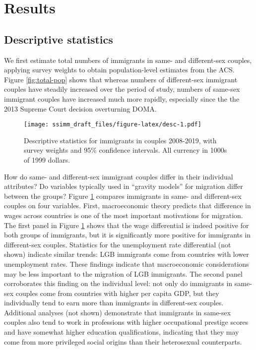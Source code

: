 \documentclass[
  11pt,
]{article}
\begin{document}
\hypertarget{results}{%
\section{Results}\label{results}}

\hypertarget{descriptive-statistics}{%
\subsection{Descriptive statistics}\label{descriptive-statistics}}

We first estimate total numbers of immigrants in same- and different-sex couples, applying survey weights to obtain population-level estimates from the ACS. Figure \ref{fig:total-pop} shows that whereas numbers of different-sex immigrant couples have steadily increased over the period of study, numbers of same-sex immigrant couples have increased much more rapidly, especially since the the 2013 Supreme Court decision overturning DOMA.

\begin{figure}
\centering
\texttt{[image: ssimm\_draft\_files/figure-latex/desc-1.pdf]}
\caption{\label{fig:desc}Descriptive statistics for immigrants in couples 2008-2019, with survey weights and 95\% confidence intervals. All currency in 1000s of 1999 dollars.}
\end{figure}

How do same- and different-sex immigrant couples differ in their individual attributes? Do variables typically used in ``gravity models'' for migration differ between the groups? Figure \ref{fig:desc} compares immigrants in same- and different-sex couples on four variables. First, macroeconomic theory predicts that difference in wages across countries is one of the most important motivations for migration. The first panel in Figure \ref{fig:desc} shows that the wage differential is indeed positive for both groups of immigrants, but it is significantly more positive for immigrants in different-sex couples. Statistics for the unemployment rate differential (not shown) indicate similar trends: LGB immigrants come from countries with lower unemployment rates. These findings indicate that macroeconomic considerations may be less important to the migration of LGB immigrants. The second panel corroborates this finding on the individual level: not only do immigrants in same-sex couples come from countries with higher per capita GDP, but they individually tend to earn more than immigrants in different-sex couples. Additional analyses (not shown) demonstrate that immigrants in same-sex couples also tend to work in professions with higher occupational prestige scores and have somewhat higher education qualifications, indicating that they may come from more privileged social origins than their heterosexual counterparts.
\end{document}
